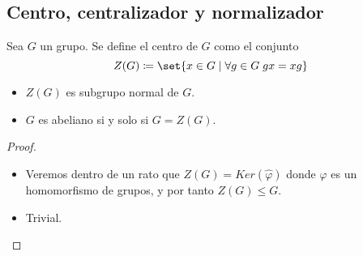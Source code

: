 \subsection{Centro, centralizador y normalizador}
\begin{definition}
	Sea \(G \) un grupo. Se define el centro de \(G \) como el conjunto
	\[
		Z (G) \coloneqq \set{x \in G \mid \forall g \in G \; gx = xg }
	\]
\end{definition}
\begin{proposition}
	\begin{itemize}
		\item \(Z(G )\) es subgrupo normal de \(G \).
		\item \(G \) es abeliano si y solo si \(G = Z (G )\).
	\end{itemize}
\end{proposition}
\begin{proof}
	\begin{itemize}
		\item Veremos dentro de un rato que \(Z(G) = Ker(\hat{\varphi})\) donde \(\hat{\varphi}\) es un homomorfismo de grupos, y por tanto \(Z(G) \leq G \).
		\item Trivial.
	\end{itemize}
\end{proof}
